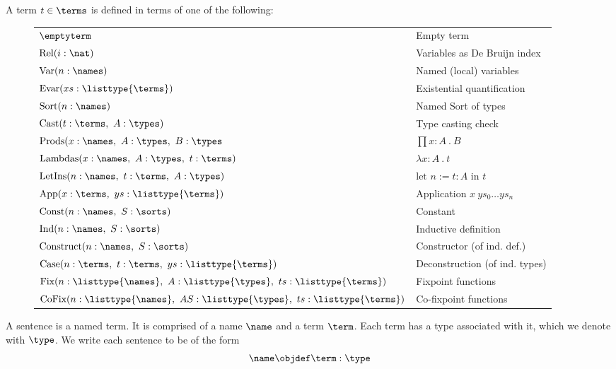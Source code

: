 \begin{definition}
	A \pcic term $t \in \terms$ is defined in terms of one of the following:

	\begin{figure}[H]
		\centering
		\begin{tabular}{ll}
			$\emptyterm$                                        & Empty term\glsadd{emptyterm} \\
			$\text{Rel}(i:\nat)$                       & Variables as De Bruijn \cite{de1972lambda} index \\
			$\text{Var}(n:\names)$                     & Named (local) variables \\
			$\text{Evar}(xs:\listtype{\terms}) $        & Existential quantification \\
			$\text{Sort}(n:\names)$                    & Named Sort of types \\
			$\text{Cast}(t:\terms,~ A:\types)$ & Type casting check \\
			$\text{Prods}(x:\names,~ A:\types,~ B:\types$ & $\prod x:A ~.~ B$ \\
			$\text{Lambdas}(x:\names,~ A:\types,~ t:\terms)$   & $\lambda x:A ~.~ t$ \\
			$\text{LetIns}(n:\names,~ t:\terms,~ A:\types)$    & $\text{let~} n := t : A \text{~in~} t$ \\
			$\text{App}(x:\terms,~ ys:\listtype{\terms})$ & Application $x~ys_0 \ldots ys_n$ \\
			$\text{Const}(n:\names,~ S:\sorts)$ & Constant \\
			$\text{Ind}(n:\names,~ S:\sorts)$  & Inductive definition \\
			$\text{Construct}(n:\names,~ S:\sorts)$ & Constructor (of ind. def.) \\
			$\text{Case}(n:\terms,~ t:\terms,~ ys:\listtype{\terms})$ & Deconstruction (of ind. types) \\
			$\text{Fix}(n:\listtype{\names},~ A:\listtype{\types},~ ts:\listtype{\terms})$ & Fixpoint functions \\
			$\text{CoFix}(n:\listtype{\names},~ AS:\listtype{\types},~ ts:\listtype{\terms})$ & Co-fixpoint functions \\
		\end{tabular}
	\end{figure}
\end{definition}

\begin{definition}[sentence]
	A sentence is a named term. It is comprised of a name $\name$ and a term $\term$. Each term has a type associated with it, which we denote with $\type$.
	We write each sentence to be of the form
	\[\name \objdef \term : \type\]
\end{definition}

